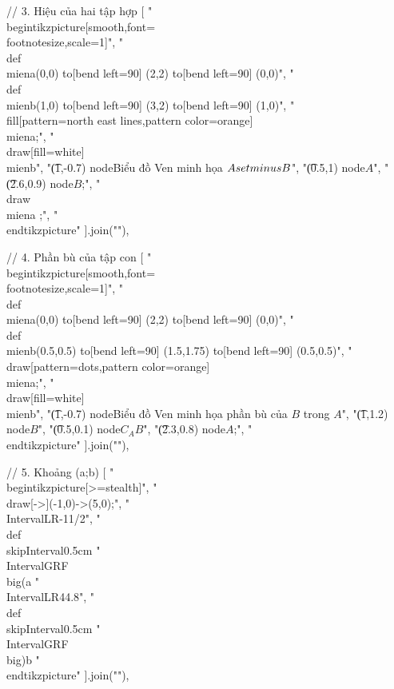// 3. Hiệu của hai tập hợp
[
"\\begin{tikzpicture}[smooth,font=\\footnotesize,scale=1]",
"\t\\def\\miena{(0,0) to[bend left=90] (2,2) to[bend left=90] (0,0)}",
"\t\\def\\mienb{(1,0) to[bend left=90] (3,2) to[bend left=90] (1,0)}",
"\t\\fill[pattern=north east lines,pattern color=orange] \\miena;",
"\t\\draw[fill=white] \\mienb",
"\t(1,-0.7) node{Biểu đồ Ven minh họa $A \\setminus B$}",
"\t(0.5,1) node{$A$}",
"\t(2.6,0.9) node{$B$};",
"\t\\draw \\miena ;",
"\\end{tikzpicture}"
].join("\n"),

// 4. Phần bù của tập con
[
"\\begin{tikzpicture}[smooth,font=\\footnotesize,scale=1]",
"\t\\def\\miena{(0,0) to[bend left=90] (2,2) to[bend left=90] (0,0)}",
"\t\\def\\mienb{(0.5,0.5) to[bend left=90] (1.5,1.75) to[bend left=90] (0.5,0.5)}",
"\t\\draw[pattern=dots,pattern color=orange] \\miena;",
"\t\\draw[fill=white] \\mienb",
"\t(1,-0.7) node{Biểu đồ Ven minh họa phần bù của $B$ trong $A$}",
"\t(1,1.2) node{$B$}",
"\t(0.5,0.1) node{$C_AB$}",
"\t(2.3,0.8) node{$A$};",
"\\end{tikzpicture}"
].join("\n"),

// 5. Khoảng (a;b)
[
"\\begin{tikzpicture}[>=stealth]",
"\t\\draw[->](-1,0)->(5,0);",
"\t\\IntervalLR{-1}{1/2}",
"\t\\def\\skipInterval{0.5cm}%
"\t\\IntervalGRF{}{}{\\big(}{a}%
"\t\\IntervalLR{4}{4.8}",
"\t\\def\\skipInterval{0.5cm}%
"\t\\IntervalGRF{\\big)}{b}{}{}%
"\\end{tikzpicture}"
].join("\n"),

